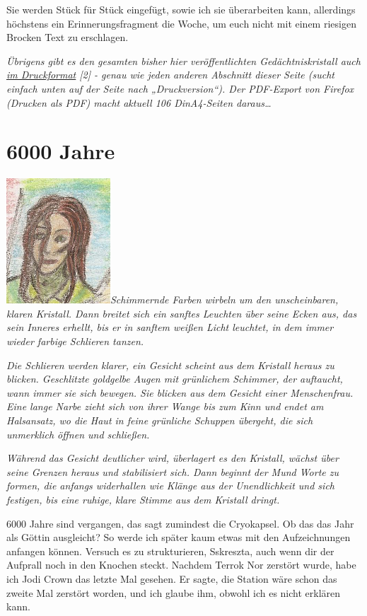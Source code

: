 \documentclass[11pt]{scrartcl}
\begin{document}
Sie werden Stück für Stück eingefügt, sowie ich sie überarbeiten kann,
allerdings höchstens ein Erinnerungsfragment die Woche, um euch nicht
mit einem riesigen Brocken Text zu erschlagen.

\emph{Übrigens gibt es den gesamten bisher hier veröffentlichten
Gedächtniskristall auch
\href{http://1w6.org/print/book/export/html/59}{im Druckformat} {[}2{]}
- genau wie jeden anderen Abschnitt dieser Seite (sucht einfach unten
auf der Seite nach „Druckversion``). Der PDF-Export von Firefox (Drucken
als PDF) macht aktuell 106 DinA4-Seiten daraus\ldots{}}

\section{6000 Jahre}

\includegraphics{sskreszta-portrait-alt-klein.png}\emph{Schimmernde
Farben wirbeln um den unscheinbaren, klaren Kristall. Dann breitet sich
ein sanftes Leuchten über seine Ecken aus, das sein Inneres erhellt, bis
er in sanftem weißen Licht leuchtet, in dem immer wieder farbige
Schlieren tanzen.}

\emph{Die Schlieren werden klarer, ein Gesicht scheint aus dem Kristall
heraus zu blicken. Geschlitzte goldgelbe Augen mit grünlichem Schimmer,
der auftaucht, wann immer sie sich bewegen. Sie blicken aus dem Gesicht
einer Menschenfrau. Eine lange Narbe zieht sich von ihrer Wange bis zum
Kinn und endet am Halsansatz, wo die Haut in feine grünliche Schuppen
übergeht, die sich unmerklich öffnen und schließen.}

\emph{Während das Gesicht deutlicher wird, überlagert es den Kristall,
wächst über seine Grenzen heraus und stabilisiert sich. Dann beginnt der
Mund Worte zu formen, die anfangs widerhallen wie Klänge aus der
Unendlichkeit und sich festigen, bis eine ruhige, klare Stimme aus dem
Kristall dringt.}

6000 Jahre sind vergangen, das sagt zumindest die Cryokapsel. Ob das das
Jahr als Göttin ausgleicht? So werde ich später kaum etwas mit den
Aufzeichnungen anfangen können. Versuch es zu strukturieren, Sskreszta,
auch wenn dir der Aufprall noch in den Knochen steckt. Nachdem Terrok
Nor zerstört wurde, habe ich Jodi Crown das letzte Mal gesehen. Er
sagte, die Station wäre schon das zweite Mal zerstört worden, und ich
glaube ihm, obwohl ich es nicht erklären kann.
\end{document}
